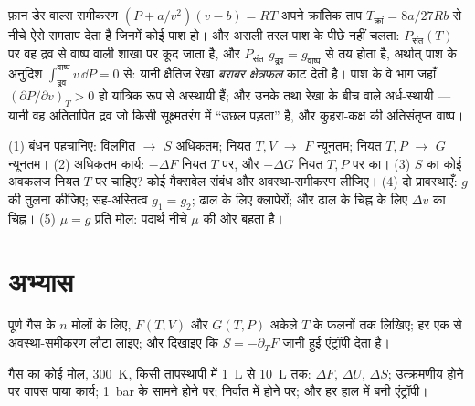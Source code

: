 \begin{remark}[फ़ान डेर वाल्स और मैक्सवेल की रचना]\label{rem:b2:thermodynamic-potentials:maxwellconstruction}
फ़ान डेर वाल्स समीकरण $(P + a/v^2)(v - b) = RT$ अपने
क्रांतिक ताप $T_{\text{क्रां}} = 8a/27Rb$ से नीचे ऐसे समताप देता है जिनमें कोई पाश हो। और
असली तरल पाश के पीछे नहीं चलता: $P_{\text{संत}}(T)$ पर वह
द्रव से वाष्प वाली शाखा पर कूद जाता है, और $P_{\text{संत}}$ $g_{\text{द्रव}}
= g_{\text{वाष्प}}$ से तय होता है, अर्थात् पाश के अनुदिश $\int_{\text{द्रव}}^{\text{वाष्प}}v\,\dd P = 0$
से: यानी क्षैतिज रेखा \emph{बराबर क्षेत्रफल} काट देती है। पाश के वे भाग
जहाँ $(\partial P/\partial v)_T > 0$ हो यांत्रिक रूप से अस्थायी हैं; और
उनके तथा रेखा के बीच वाले अर्ध-स्थायी --- यानी वह अतितापित
द्रव जो किसी सूक्ष्मतरंग में ``उछल पड़ता'' है, और कुहरा-कक्ष की अतिसंतृप्त वाष्प।
\end{remark}

\begin{method}[विभवों को काम में लेना]\label{meth:b2:thermodynamic-potentials:method}
(1) बंधन पहचानिए: विलगित $\to$ $S$ अधिकतम; नियत $T,V$ $\to$
$F$ न्यूनतम; नियत $T,P$ $\to$ $G$ न्यूनतम। (2) अधिकतम कार्य: $-\Delta F$ नियत $T$ पर,
और $-\Delta G$ नियत $T,P$ पर  का। (3) $S$ का कोई अवकलज
नियत $T$ पर चाहिए? कोई मैक्सवेल संबंध और अवस्था-समीकरण लीजिए।
(4) दो प्रावस्थाएँ: $g$ की तुलना कीजिए; सह-अस्तित्व $g_1 = g_2$; ढाल के लिए
क्लापेरों; और ढाल के चिह्न के लिए $\Delta v$ का चिह्न। (5)  $\mu = g$ प्रति मोल: पदार्थ नीचे $\mu$ की ओर बहता है।
\end{method}

\section{अभ्यास}

\begin{exercise}[$\star$]\label{exo:b2:thermodynamic-potentials:1}
पूर्ण गैस के $n$ मोलों के लिए, $F(T,V)$ और $G(T,P)$ अकेले $T$ के फलनों
तक लिखिए; हर एक से अवस्था-समीकरण लौटा लाइए; और दिखाइए
कि $S = -\partial_TF$ जानी हुई एंट्रॉपी देता है।
\end{exercise}

\begin{exercise}[$\star$]\label{exo:b2:thermodynamic-potentials:2}
गैस का कोई मोल, \qty{300}{K}, किसी तापस्थापी में \qty{1}{L} से \qty{10}{L}
तक: $\Delta F$, $\Delta U$, $\Delta S$; उत्क्रमणीय होने पर वापस पाया कार्य;
\qty{1}{bar} के सामने होने पर; निर्वात में होने पर; और हर हाल में बनी
एंट्रॉपी।
\end{exercise}

